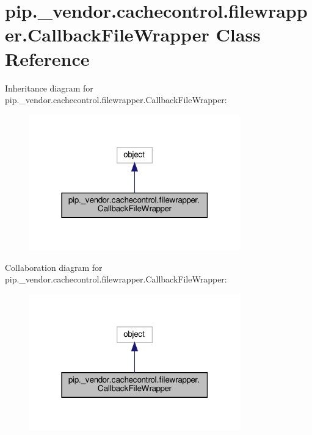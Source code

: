 \hypertarget{classpip_1_1__vendor_1_1cachecontrol_1_1filewrapper_1_1CallbackFileWrapper}{}\section{pip.\+\_\+vendor.\+cachecontrol.\+filewrapper.\+Callback\+File\+Wrapper Class Reference}
\label{classpip_1_1__vendor_1_1cachecontrol_1_1filewrapper_1_1CallbackFileWrapper}


Inheritance diagram for pip.\+\_\+vendor.\+cachecontrol.\+filewrapper.\+Callback\+File\+Wrapper\+:
\nopagebreak
\begin{figure}[H]
\begin{center}
\leavevmode
\includegraphics[width=259pt]{classpip_1_1__vendor_1_1cachecontrol_1_1filewrapper_1_1CallbackFileWrapper__inherit__graph}
\end{center}
\end{figure}


Collaboration diagram for pip.\+\_\+vendor.\+cachecontrol.\+filewrapper.\+Callback\+File\+Wrapper\+:
\nopagebreak
\begin{figure}[H]
\begin{center}
\leavevmode
\includegraphics[width=259pt]{classpip_1_1__vendor_1_1cachecontrol_1_1filewrapper_1_1CallbackFileWrapper__coll__graph}
\end{center}
\end{figure}
